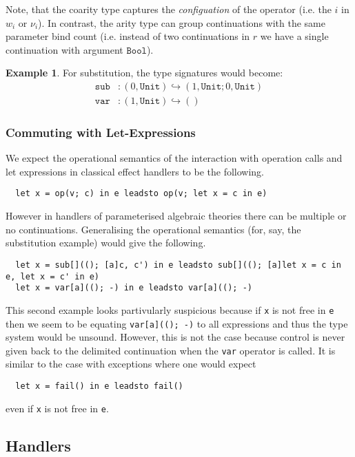 \documentclass{scrartcl}
\theoremstyle{definition}
\newtheorem{example}[theorem]{Example}
\newcommand{\Unit}{\mathtt{Unit}}
\newcommand{\Bool}{\mathtt{Bool}}
\newcommand{\sub}{\mathtt{sub}}
\newcommand{\var}{\mathtt{var}}
\begin{document}
Note, that the coarity type captures the \emph{configuation} of the operator (i.e. the $i$ in $w_i$ or $\nu_i$). In contrast, the arity type can group continuations with the same parameter bind count (i.e. instead of two continuations in $r$ we have a single continuation with argument $\Bool$).

\begin{example}
For substitution, the type signatures would become:
\begin{align*}
    \sub &: (0, \Unit) \hookrightarrow (1, \Unit; 0, \Unit) \\
    \var &: (1, \Unit) \hookrightarrow ()
\end{align*}
\end{example}

\subsubsection{Commuting with Let-Expressions}

We expect the operational semantics of the interaction with operation calls and let expressions in classical effect handlers to be the following.
\begin{lstlisting}
  let x = op(v; c) in e leadsto op(v; let x = c in e)
\end{lstlisting}
However in handlers of parameterised algebraic theories there can be multiple or no continuations. Generalising the operational semantics (for, say, the substitution example) would give the following.
\begin{lstlisting}
  let x = sub[]((); [a]c, c') in e leadsto sub[]((); [a]let x = c in e, let x = c' in e)
  let x = var[a]((); -) in e leadsto var[a]((); -)
\end{lstlisting}
This second example looks partivularly suspicious because if \lstinline{x} is not free in \lstinline{e} then we seem to be equating \lstinline{var[a]((); -)} to all expressions and thus the
type system would be unsound. However, this is not the case because control is never given back to the delimited continuation when the \lstinline{var} operator is called. It is similar to the
case with exceptions where one would expect
\begin{lstlisting}
  let x = fail() in e leadsto fail()
\end{lstlisting}
even if \lstinline{x} is not free in \lstinline{e}.

\subsection{Handlers}
\end{document}
